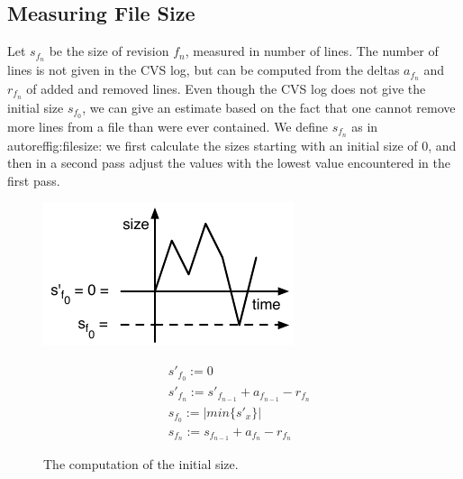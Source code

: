 \subsection{Measuring File Size}

Let $s_{f_n}$ be the size of revision $f_n$, measured in number of lines. The number of lines is not given in the CVS log, but can be computed from the deltas $a_{f_n}$ and $r_{f_n}$ of added and removed lines. Even though the CVS log does not give the initial size $s_{f_0}$, we can give an estimate based on the fact that one cannot remove more lines from a file than were ever contained. We define $s_{f_n}$ as in autoref{fig:filesize}: we first calculate the sizes starting with an initial size of 0, and then in a second pass adjust the values with the lowest value encountered in the first pass.

\begin{figure}[htbp]
\begin{minipage}[c]{.45\linewidth}
\includegraphics[width=1.2\linewidth]{fig/chronia-minimum}
 \end{minipage}
 \hfill
 \begin{minipage}[c]{.5\linewidth}
\begin{eqnarray}
& s'_{f_0} := 0 \nonumber \\
& s'_{f_n} := s'_{f_{n-1}} + a_{f_{n-1}} - r_{f_n} \nonumber  \\
& s_{f_0} := \vert min \{ s'_x \} \vert \nonumber \\
& s_{f_n} := s_{f_{n-1}} + a_{f_n} - r_{f_n} \nonumber
 \end{eqnarray}
 \end{minipage}
\caption{The computation of the initial size.}
\label{fig:filesize}
\end{figure}

